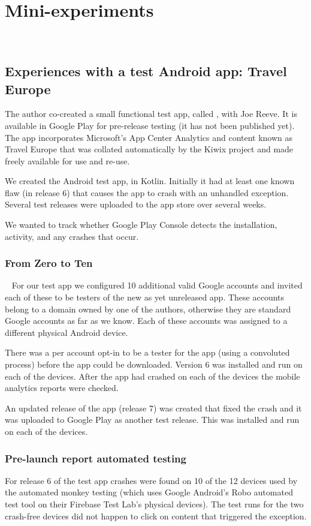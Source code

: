 \chapter{Mini-experiments}~\label{appendix-mini-experiments}

\section{Experiences with a test Android app: Travel Europe}
The author co-created a small functional test app, called , with Joe Reeve. It is available in Google Play for pre-release testing (it has not been published yet). The app incorporates Microsoft's App Center Analytics and content known as Travel Europe that was collated automatically by the Kiwix project and made freely available for use and re-use.

We created the Android test app, in Kotlin. Initially it had at least one known flaw (in release 6) that causes the app to crash with an unhandled exception. Several test releases were uploaded to the app store over several weeks.

We wanted to track whether Google Play Console detects the installation, activity, and any crashes that occur.

\subsection{From Zero to Ten}~\label{appendix-from-zero-to-ten-topic}
For our test app we configured 10 additional valid Google accounts and invited each of these to be testers of the new as yet unreleased app. These accounts belong to a domain owned by one of the authors, otherwise they are standard Google accounts as far as we know. Each of these accounts was assigned to a different physical Android device.

There was a per account opt-in to be a tester for the app (using a convoluted process) before the app could be downloaded. Version 6 was installed and run on each of the devices. After the app had crashed on each of the devices the mobile analytics reports were checked.

An updated release of the app (release 7) was created that fixed the crash and it was uploaded to Google Play as another test release. This was installed and run on each of the devices.

\subsection{Pre-launch report automated testing}
For release 6 of the test app crashes were found on 10 of the 12 devices used by the automated monkey testing (which uses Google Android's Robo automated test tool on their Firebase Test Lab's physical devices). The test runs for the two crash-free devices did not happen to click on content that triggered the exception.

